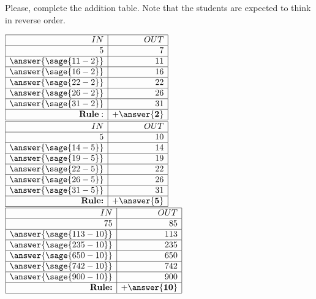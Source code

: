 \documentclass{ximera}
\begin{document}
\begin{problem}
Please, complete the addition table. Note that the students are expected to think in reverse order.

$
\begin{array}{|r|r|}
\hline
 IN & OUT \\
 \hline
 5 & 7 \\
 \hline
\answer{\sage{11-2}} & 11 \\
 \hline
 \answer{\sage{16-2}}  & 16 \\
 \hline
 \answer{\sage{22-2}}  & 22 \\
 \hline
  \answer{\sage{26-2}} & 26 \\
 \hline
  \answer{\sage{31-2}} & 31 \\
 \hline
 \mathbf{Rule:} & \mathbf{+\answer{2}} \\
 \hline
\end{array}
$
\hfill
$
\begin{array}{|r|r|}
\hline
 IN & OUT \\
 \hline
 5 & 10 \\
 \hline
  \answer{\sage{14-5}} & 14 \\
 \hline
 \answer{\sage{19-5}}  & 19 \\
 \hline
 \answer{\sage{22-5}}  & 22 \\
 \hline
 \answer{\sage{26-5}}  & 26 \\
 \hline
 \answer{\sage{31-5}}  & 31 \\
 \hline
 \textbf{Rule:} & \mathbf{+\answer{5}} \\
 \hline
\end{array}
$
\hfill
$
\begin{array}{|r|r|}
\hline
 IN & OUT \\
 \hline
 75 & 85 \\
 \hline
 \answer{\sage{113-10}}  & 113 \\
 \hline
 \answer{\sage{235-10}}  & 235 \\
 \hline
 \answer{\sage{650-10}}  & 650 \\
 \hline
 \answer{\sage{742-10}}  & 742 \\
 \hline
 \answer{\sage{900-10}}  & 900 \\
 \hline
 \textbf{Rule:} & \mathbf{+\answer{10}} \\
 \hline
\end{array}
$
\end{problem}
\end{document}
